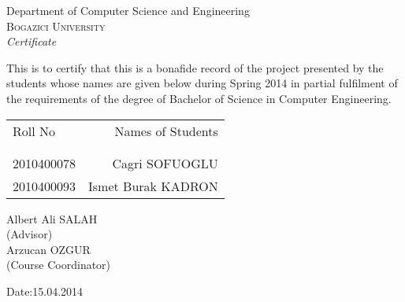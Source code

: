 \newpage
\thispagestyle{empty}

\begin{center}

\huge{Department of Computer Science and Engineering}\\[0.5cm]
\normalsize
\textsc{Bogazici University}\\[2.0cm]

\emph{\LARGE Certificate}\\[2.5cm]
\end{center}
\normalsize This is to certify that this is a bonafide record of the project presented by the students whose names are given below during Spring 2014 in partial fulfilment of the requirements of the degree of Bachelor of Science in Computer Engineering.\\[1.0cm]

\begin{table}[h]
\centering
\begin{tabular}{lr}
Roll No & Names of Students \\ \\ \hline
\\
2010400078 & Cagri SOFUOGLU \\ 
2010400093 & Ismet Burak KADRON \\
\end{tabular}
\end{table}

\vfill


\begin{flushright}
Albert Ali SALAH\\
(Advisor)\\[1.5cm]
Arzucan OZGUR\\
(Course Coordinator)\\
\end{flushright}

\begin{flushleft}
Date:15.04.2014
\end{flushleft}
